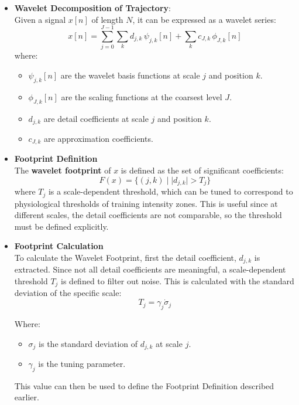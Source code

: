 \documentclass[12pt,a4paper]{report}
\begin{document}
\begin{itemize}
	\item \textbf{Wavelet Decomposition of Trajectory}: \\ Given a signal $x[n]$ of length $N$, it can be expressed as a wavelet series:
	      \[
		      x[n] =
		      \sum_{j=0}^{J-1} \sum_{k} d_{j,k} \, \psi_{j,k}[n]
		      + \sum_{k} c_{J,k} \, \phi_{J,k}[n]
	      \]
	      where:
	      \begin{itemize}
		      \item $\psi_{j,k}[n]$ are the wavelet basis functions at scale $j$ and position $k$.
		      \item $\phi_{J,k}[n]$ are the scaling functions at the coarsest level $J$.
		      \item $d_{j,k}$ are detail coefficients at scale $j$ and position $k$.
		      \item $c_{J,k}$ are approximation coefficients.
	      \end{itemize}
	\item \textbf{Footprint Definition}\\
	      The \textbf{wavelet footprint} of $x$ is defined as the set of significant coefficients:
	      \[
		      F(x) = \{ (j,k) \;|\; |d_{j,k}| > T_j \}
	      \]
	      where $T_j$ is a scale-dependent threshold, which can be tuned to correspond to physiological thresholds of training intensity zones. This is useful since
	      at different scales, the detail coefficients are not comparable, so the threshold must be defined explicitly.

	\item \textbf{Footprint Calculation}\\
	      To calculate the Wavelet Footprint, first the detail coefficient, $d_{j,k}$ is extracted. Since not all detail coefficients are meaningful, a scale-dependent threshold $T_j$
	      is defined to filter out noise. This is calculated with the standard deviation of the specific scale:
	      \[
		      T_j = \gamma_j \dot \sigma_j
	      \]

	      Where:
	      \begin{itemize}
		      \item $\sigma_j$ is the standard deviation of $d_{j,k}$ at scale $j$.
		      \item $\gamma_j$ is the tuning parameter.
	      \end{itemize}
	      This value can then be used to define the Footprint Definition described earlier.


\end{itemize}
\end{document}
